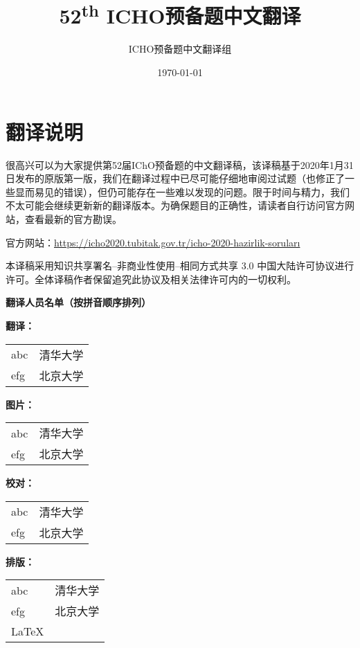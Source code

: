 \documentclass[12pt]{report}
\title{52\textsuperscript{th} ICHO预备题中文翻译}
\author{ICHO预备题中文翻译组}
\date{\today}
\begin{document}
                     
\maketitle                              %
\newpage
{}          
\setcounter{page}{2}                    %
\section*{翻译说明}
很高兴可以为大家提供第52届IChO预备题的中文翻译稿，该译稿基于2020年1月31日发布的原版第一版，我们在翻译过程中已尽可能仔细地审阅过试题（也修正了一些显而易见的错误），但仍可能存在一些难以发现的问题。限于时间与精力，我们不太可能会继续更新新的翻译版本。为确保题目的正确性，请读者自行访问官方网站，查看最新的官方勘误。

官方网站：\href{https://https://icho2020.tubitak.gov.tr/icho-2020-hazirlik-sorular%C4%B1}{https://icho2020.tubitak.gov.tr/icho-2020-hazirlik-soruları}

本译稿采用知识共享署名–非商业性使用–相同方式共享 3.0 中国大陆许可协议进行许可。全体译稿作者保留追究此协议及相关法律许可内的一切权利。

\noindent \textbf{翻译人员名单（按拼音顺序排列）}

\textbf{翻译：}


\begin{longtable}{ p{2cm}p{12cm} } %
abc&清华大学\\
efg&北京大学\\

\end{longtable}
\textbf{图片：}

\begin{longtable}{ p{2cm}p{12cm}}  %
abc&清华大学\\
efg&北京大学\\
\end{longtable}
\textbf{校对：}

\begin{longtable}{p{2cm}p{12cm} }  %
abc&清华大学\\
efg&北京大学\\
\end{longtable}
\textbf{排版：}

\begin{longtable}{p{2cm}p{12cm} }  %
abc&清华大学\\
efg&北京大学\\
	\LaTeX
\end{longtable}
\end{document}
